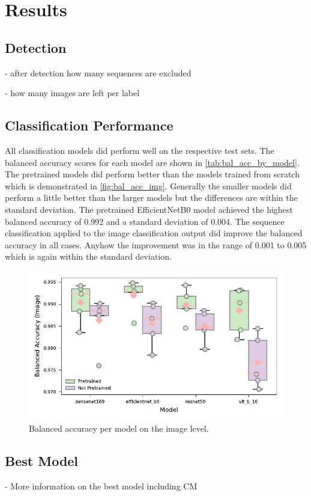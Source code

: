 

\section{Results}
\label{results}

    \subsection{Detection}

    - after detection how many sequences are excluded

    - how many images are left per label

    \subsection{Classification Performance}

    All classification models did perform well on the respective test sets.
    The balanced accuracy scores for each model are shown in \autoref{tab:bal_acc_by_model}.
    The pretrained models did perform better than the models trained from scratch which is demonstrated in \autoref{fig:bal_acc_img}.
    Generally the smaller models did perform a little better than the larger models but the differences are within the standard deviation.
    The pretrained EfficientNetB0 model achieved the highest balanced accuracy of 0.992 and a standard deviation of 0.004.
    The sequence classification applied to the image classification output did improve the balanced accuracy in all cases.
    Anyhow the improvement was in the range of 0.001 to 0.005 which is again within the standard deviation.

    

    \begin{figure}[ht]
    \centering
    \includegraphics{figures/bal_acc_img.pdf}
    \caption{Balanced accuracy per model on the image level.}
    \label{fig:bal_acc_img}
    \end{figure}


    \subsection{Best Model}

    - More information on the best model including CM